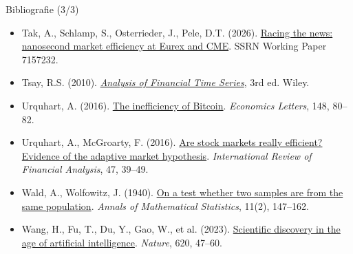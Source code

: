 \begin{frame}{Bibliografie (3/3)}
\begin{itemize}
    \item Tak, A., Schlamp, S., Osterrieder, J., Pele, D.T. (2026). \href{https://doi.org/10.2139/ssrn.7157232}{Racing the news: nanosecond market efficiency at Eurex and CME}. SSRN Working Paper 7157232.
    \item Tsay, R.S. (2010). \href{https://doi.org/10.1002/9780470644560}{\textit{Analysis of Financial Time Series}}, 3rd ed. Wiley.
    \item Urquhart, A. (2016). \href{https://doi.org/10.1016/j.econlet.2016.09.019}{The inefficiency of Bitcoin}. \textit{Economics Letters}, 148, 80--82.
    \item Urquhart, A., McGroarty, F. (2016). \href{https://doi.org/10.1016/j.irfa.2016.06.011}{Are stock markets really efficient? Evidence of the adaptive market hypothesis}. \textit{International Review of Financial Analysis}, 47, 39--49.
    \item Wald, A., Wolfowitz, J. (1940). \href{https://doi.org/10.1214/aoms/1177731909}{On a test whether two samples are from the same population}. \textit{Annals of Mathematical Statistics}, 11(2), 147--162.
    \item Wang, H., Fu, T., Du, Y., Gao, W., et al. (2023). \href{https://doi.org/10.1038/s41586-023-06221-2}{Scientific discovery in the age of artificial intelligence}. \textit{Nature}, 620, 47--60.
\end{itemize}
\end{frame}


